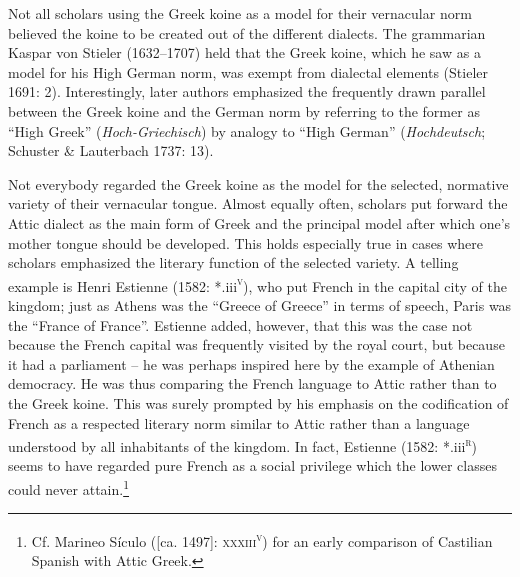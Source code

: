\begin{styleStandard}
Not all scholars using the Greek koine as a model for their vernacular norm believed the koine to be created out of the different dialects. The grammarian Kaspar von Stieler (1632–1707) held that the Greek koine, which he saw as a model for his High German norm, was exempt from dialectal elements (Stieler 1691: 2). Interestingly, later authors emphasized the frequently drawn parallel between the Greek koine and the German norm by referring to the former as “High Greek” (\textit{Hoch-Griechisch}) by analogy to “High German” (\textit{Hochdeutsch}; Schuster \& Lauterbach 1737: 13).
\end{styleStandard}

\begin{styleStandard}
Not everybody regarded the Greek koine as the model for the selected, normative variety of their vernacular tongue. Almost equally often, scholars put forward the Attic dialect as the main form of Greek and the principal model after which one’s mother tongue should be developed. This holds especially true in cases where scholars emphasized the literary function of the selected variety. A telling example is Henri Estienne (1582: *.iii\textsc{\textsuperscript{v}}), who put French in the capital city of the kingdom; just as Athens was the “Greece of Greece” in terms of speech, Paris was the “France of France”. Estienne added, however, that this was the case not because the French capital was frequently visited by the royal court, but because it had a parliament – he was perhaps inspired here by the example of Athenian democracy. He was thus comparing the French language to Attic rather than to the Greek koine. This was surely prompted by his emphasis on the codification of French as a respected literary norm similar to Attic rather than a language understood by all inhabitants of the kingdom. In fact, Estienne (1582: *.iii\textsc{\textsuperscript{r}}) seems to have regarded pure French as a social privilege which the lower classes could never attain.\footnote{ Cf. Marineo Sículo ([ca. 1497]: \textsc{xxxiii}\textsc{\textsuperscript{v}}) for an early comparison of Castilian Spanish with Attic Greek.}
\end{styleStandard}

